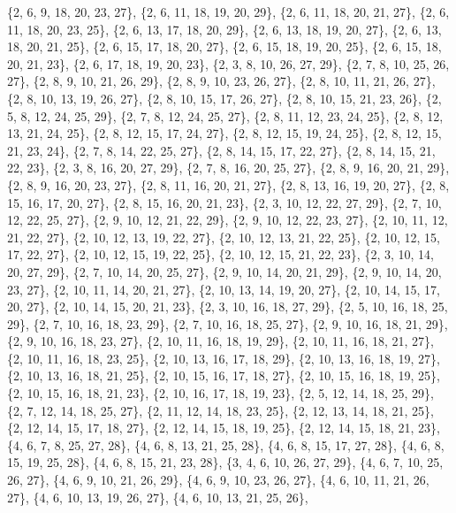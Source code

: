 \documentclass[11pt,a4paper]{article}
\begin{document}
{\{2, 6, 9, 18, 20, 23, 27\}, \{2, 6, 11, 18, 19, 20, 29\}, \{2, 6, 11, 18, 20, 21, 27\}, \{2, 6, 11, 18, 20, 23, 25\}, \{2, 6, 13, 17, 18, 20, 29\},
\{2, 6, 13, 18, 19, 20, 27\}, \{2, 6, 13, 18, 20, 21, 25\}, \{2, 6, 15, 17, 18, 20, 27\}, \{2, 6, 15, 18, 19, 20, 25\}, \{2, 6, 15, 18, 20, 21, 23\},
\{2, 6, 17, 18, 19, 20, 23\}, \{2, 3, 8, 10, 26, 27, 29\}, \{2, 7, 8, 10, 25, 26, 27\}, \{2, 8, 9, 10, 21, 26, 29\}, \{2, 8, 9, 10, 23, 26, 27\},
\{2, 8, 10, 11, 21, 26, 27\}, \{2, 8, 10, 13, 19, 26, 27\}, \{2, 8, 10, 15, 17, 26, 27\}, \{2, 8, 10, 15, 21, 23, 26\}, \{2, 5, 8, 12, 24, 25, 29\},
\{2, 7, 8, 12, 24, 25, 27\}, \{2, 8, 11, 12, 23, 24, 25\}, \{2, 8, 12, 13, 21, 24, 25\}, \{2, 8, 12, 15, 17, 24, 27\}, \{2, 8, 12, 15, 19, 24, 25\},
\{2, 8, 12, 15, 21, 23, 24\}, \{2, 7, 8, 14, 22, 25, 27\}, \{2, 8, 14, 15, 17, 22, 27\}, \{2, 8, 14, 15, 21, 22, 23\}, \{2, 3, 8, 16, 20, 27, 29\},
\{2, 7, 8, 16, 20, 25, 27\}, \{2, 8, 9, 16, 20, 21, 29\}, \{2, 8, 9, 16, 20, 23, 27\}, \{2, 8, 11, 16, 20, 21, 27\}, \{2, 8, 13, 16, 19, 20, 27\},
\{2, 8, 15, 16, 17, 20, 27\}, \{2, 8, 15, 16, 20, 21, 23\}, \{2, 3, 10, 12, 22, 27, 29\}, \{2, 7, 10, 12, 22, 25, 27\}, \{2, 9, 10, 12, 21, 22, 29\},
\{2, 9, 10, 12, 22, 23, 27\}, \{2, 10, 11, 12, 21, 22, 27\}, \{2, 10, 12, 13, 19, 22, 27\}, \{2, 10, 12, 13, 21, 22, 25\}, \{2, 10, 12, 15, 17, 22, 27\},
\{2, 10, 12, 15, 19, 22, 25\}, \{2, 10, 12, 15, 21, 22, 23\}, \{2, 3, 10, 14, 20, 27, 29\}, \{2, 7, 10, 14, 20, 25, 27\}, \{2, 9, 10, 14, 20, 21, 29\},
\{2, 9, 10, 14, 20, 23, 27\}, \{2, 10, 11, 14, 20, 21, 27\}, \{2, 10, 13, 14, 19, 20, 27\}, \{2, 10, 14, 15, 17, 20, 27\}, \{2, 10, 14, 15, 20, 21, 23\},
\{2, 3, 10, 16, 18, 27, 29\}, \{2, 5, 10, 16, 18, 25, 29\}, \{2, 7, 10, 16, 18, 23, 29\}, \{2, 7, 10, 16, 18, 25, 27\}, \{2, 9, 10, 16, 18, 21, 29\},
\{2, 9, 10, 16, 18, 23, 27\}, \{2, 10, 11, 16, 18, 19, 29\}, \{2, 10, 11, 16, 18, 21, 27\}, \{2, 10, 11, 16, 18, 23, 25\}, \{2, 10, 13, 16, 17, 18, 29\},
\{2, 10, 13, 16, 18, 19, 27\}, \{2, 10, 13, 16, 18, 21, 25\}, \{2, 10, 15, 16, 17, 18, 27\}, \{2, 10, 15, 16, 18, 19, 25\}, \{2, 10, 15, 16, 18, 21, 23\},
\{2, 10, 16, 17, 18, 19, 23\}, \{2, 5, 12, 14, 18, 25, 29\}, \{2, 7, 12, 14, 18, 25, 27\}, \{2, 11, 12, 14, 18, 23, 25\}, \{2, 12, 13, 14, 18, 21, 25\},
\{2, 12, 14, 15, 17, 18, 27\}, \{2, 12, 14, 15, 18, 19, 25\}, \{2, 12, 14, 15, 18, 21, 23\}, \{4, 6, 7, 8, 25, 27, 28\}, \{4, 6, 8, 13, 21, 25, 28\},
\{4, 6, 8, 15, 17, 27, 28\}, \{4, 6, 8, 15, 19, 25, 28\}, \{4, 6, 8, 15, 21, 23, 28\}, \{3, 4, 6, 10, 26, 27, 29\}, \{4, 6, 7, 10, 25, 26, 27\},
\{4, 6, 9, 10, 21, 26, 29\}, \{4, 6, 9, 10, 23, 26, 27\}, \{4, 6, 10, 11, 21, 26, 27\}, \{4, 6, 10, 13, 19, 26, 27\}, \{4, 6, 10, 13, 21, 25, 26\},
}
\end{document}
